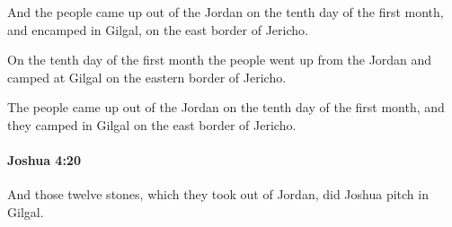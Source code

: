 			\begin{versebox}
					\item[BHS] 
					\item[ASV] And the people came up out of the Jordan on the tenth day of the first month, and encamped in Gilgal, on the east border of Jericho.
					\item[NIV] On the tenth day of the first month the people went up from the Jordan and camped at Gilgal on the eastern border of Jericho.
					\item[NRSV] The people came up out of the Jordan on the tenth day of the first month, and they camped in Gilgal on the east border of Jericho.
			\end{versebox}

		\paragraph{Joshua 4:20} %
			\label{JOSHUA-4-20}

			And those twelve stones, which they took out of Jordan, did Joshua pitch in Gilgal.

